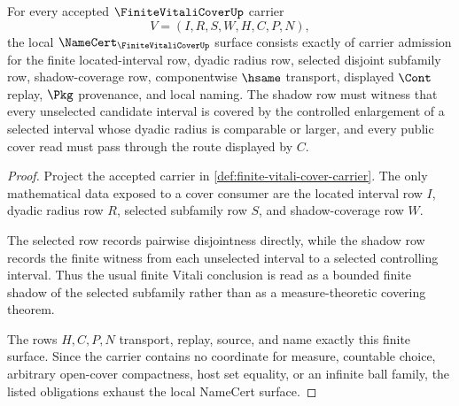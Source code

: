 \begin{theorem}\label{thm:finite-vitali-cover-namecert-obligations}
For every accepted $\FiniteVitaliCoverUp$ carrier
$$
V=(I,R,S,W,H,C,P,N),
$$
the local $\NameCert_{\FiniteVitaliCoverUp}$ surface consists exactly of carrier admission for the finite located-interval row, dyadic radius row, selected disjoint subfamily row, shadow-coverage row, componentwise $\hsame$ transport, displayed $\Cont$ replay, $\Pkg$ provenance, and local naming. The shadow row must witness that every unselected candidate interval is covered by the controlled enlargement of a selected interval whose dyadic radius is comparable or larger, and every public cover read must pass through the route displayed by $C$.
\end{theorem}
\begin{proof}
Project the accepted carrier in \autoref{def:finite-vitali-cover-carrier}. The only mathematical data exposed to a cover consumer are the located interval row $I$, dyadic radius row $R$, selected subfamily row $S$, and shadow-coverage row $W$.

The selected row records pairwise disjointness directly, while the shadow row records the finite witness from each unselected interval to a selected controlling interval. Thus the usual finite Vitali conclusion is read as a bounded finite shadow of the selected subfamily rather than as a measure-theoretic covering theorem.

The rows $H,C,P,N$ transport, replay, source, and name exactly this finite surface. Since the carrier contains no coordinate for measure, countable choice, arbitrary open-cover compactness, host set equality, or an infinite ball family, the listed obligations exhaust the local NameCert surface.
\end{proof}

